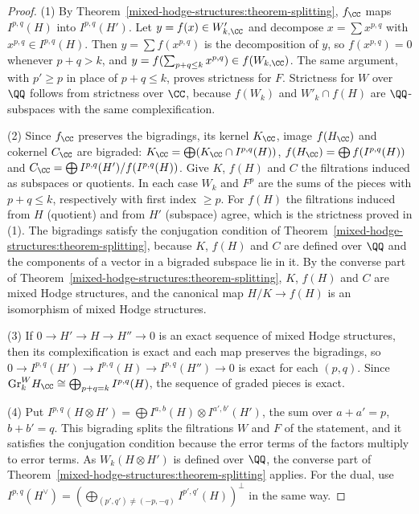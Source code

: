 \begin{proof}
(1) By Theorem~\ref{mixed-hodge-structures:theorem-splitting}, $f_\CC$ maps $I^{p,q}(H)$ into $I^{p,q}(H')$. Let $y = f(x) \in W'_{k,\CC}$ and decompose $x = \sum x^{p,q}$ with $x^{p,q} \in I^{p,q}(H)$. Then
$y = \sum f(x^{p,q})$ is the decomposition of $y$, so $f(x^{p,q}) = 0$ whenever $p + q > k$, and $y = f(\sum_{p+q \leq k}x^{p,q}) \in f(W_{k,\CC})$. The same argument, with $p' \geq p$ in place of $p + q \leq k$,
proves strictness for $F$. Strictness for $W$ over $\QQ$ follows from strictness over $\CC$, because $f(W_k)$ and $W'_k \cap f(H)$ are $\QQ$-subspaces with the same complexification.

(2) Since $f_\CC$ preserves the bigradings, its kernel $K_\CC$, image $f(H_\CC)$ and cokernel $C_\CC$ are bigraded: $K_\CC = \bigoplus(K_\CC \cap I^{p,q}(H))$, $f(H_\CC) = \bigoplus f(I^{p,q}(H))$ and
$C_\CC = \bigoplus I^{p,q}(H')/f(I^{p,q}(H))$. Give $K$, $f(H)$ and $C$ the filtrations induced as subspaces or quotients. In each case $W_k$ and $F^p$ are the sums of the pieces with $p + q \leq k$,
respectively with first index $\geq p$. For $f(H)$ the filtrations induced from $H$ (quotient) and from $H'$ (subspace) agree, which is the strictness proved in (1). The bigradings satisfy the
conjugation condition of Theorem~\ref{mixed-hodge-structures:theorem-splitting}, because $K$, $f(H)$ and $C$ are defined over $\QQ$ and the components of a vector in a bigraded subspace lie in it. By the
converse part of Theorem~\ref{mixed-hodge-structures:theorem-splitting}, $K$, $f(H)$ and $C$ are mixed Hodge structures, and the canonical map $H/K \to f(H)$ is an isomorphism of mixed Hodge structures.

(3) If $0 \to H' \to H \to H'' \to 0$ is an exact sequence of mixed Hodge structures, then its complexification is exact and each map preserves the bigradings, so
$0 \to I^{p,q}(H') \to I^{p,q}(H) \to I^{p,q}(H'') \to 0$ is exact for each $(p, q)$. Since $\mathrm{Gr}^W_kH_\CC \cong \bigoplus_{p+q=k}I^{p,q}(H)$, the sequence of graded pieces is exact.

(4) Put $I^{p,q}(H \otimes H') = \bigoplus I^{a,b}(H) \otimes I^{a',b'}(H')$, the sum over $a + a' = p$, $b + b' = q$. This bigrading splits the filtrations $W$ and $F$ of the statement, and it satisfies the
conjugation condition because the error terms of the factors multiply to error terms. As $W_k(H \otimes H')$ is defined over $\QQ$, the converse part of Theorem~\ref{mixed-hodge-structures:theorem-splitting}
applies. For the dual, use $I^{p,q}(H^\vee) = (\bigoplus_{(p',q') \neq (-p,-q)}I^{p',q'}(H))^\perp$ in the same way.
\end{proof}

